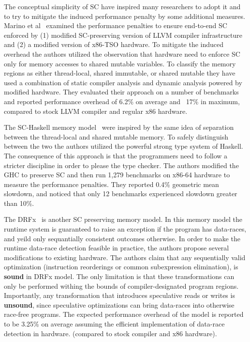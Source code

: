 The conceptual simplicity of SC have inspired many researchers 
to adopt it and to try to mitigate the induced performance 
penalty by some additional measures.
Marino et al~\cite{Marino-el:PLDI11, Singh-el:ISCA12} 
examined the performance penalties to ensure end-to-end SC
enforced by (1) modified SC-preserving version 
of LLVM compiler infrastructure and 
(2) a modified version of x86-TSO hardware. 
To mitigate the induced overhead the authors 
utilized the observation that hardware need to 
enforce SC only for memory accesses to shared mutable variables. 
To classify the memory regions as either thread-local,
shared immutable, or shared mutable they have used 
a combination of static compiler analysis and 
dynamic analysis powered by modified hardware. 
They evaluated their approach on a number of benchmarks
and reported performance overhead of 6.2\% on average 
and ~17\% in maximum, compared to stock LLVM compiler 
and regular x86 hardware. 

The SC-Haskell memory model~\cite{Vollmer-el:PPoPP17}
were inspired by the same idea of separation
between the thread-local and shared mutable memory. 
To safely distinguish between the two 
the authors utilized the powerful strong type system of Haskell. 
The consequence of this approach is that the 
programmers need to follow a stricter discipline 
in order to please the type checker. 
The authors modified the GHC to preserve SC 
and then run 1,279 benchmarks on x86-64 hardware
to measure the performance penalties.
They reported 0.4\% geometric mean slowdown,
and noticed that only 12 benchmarks experienced 
slowdown greater than 10\%.

The DRFx~\cite{Marino-el:PLDI10} is another 
SC preserving memory model. In this memory model
the runtime system is guaranteed to raise 
an exception if the program has data-races, 
and yeild only sequantially consistent outcomes otherwise.
In order to make the runtime data-race detection feasible 
in practice, the authors propose several modifications 
to existing hardware.
The authors claim that any sequentially valid optimization 
(\eg instruction reorderings or common subexpression elimination),
is \textbf{sound} in DRFx model.
The only limitation is that these transformations can only be performed
withing the bounds of compiler-designated program regions.
Importantly, any transformation that introduces 
speculative reads or writes is \textbf{unsound},
since speculative optimizations can bring
data-races into otherwise race-free programs.
The expected performance overhead of the model 
is reported to be 3.25\% on average
assuming the efficient implementation 
of data-race detection in hardware. 
(compared to stock compiler and x86 hardware). 

